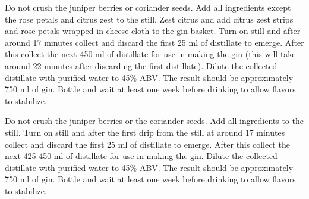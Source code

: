 \documentclass[letterpaper]{recipePMG}
\begin{document}
\newpage
{}
\label{GinNumber11}



Do not crush the juniper berries or coriander seeds. Add all ingredients except the rose petals and citrus zest to the still.  Zest citrus and add citrus zest strips and rose petals wrapped in cheese cloth to the gin basket.  Turn on still and after around 17 minutes collect and discard the first 25 ml of distillate to emerge. After this collect the next 450 ml of distillate for use in making the gin (this will take around 22 minutes after discarding the first distillate). Dilute the collected distillate with purified water to 45\% ABV. The result should be approximately 750 ml of gin. Bottle and wait at least one week before drinking to allow flavors to stabilize.


\newpage

\label{MangoMulberryGin}


Do not crush the juniper berries or the coriander seeds. Add all ingredients to the still.  Turn on still and after the first drip from the still at around 17 minutes collect and discard the first 25 ml of distillate to emerge. After this collect the next 425-450 ml of distillate for use in making the gin. Dilute the collected distillate with purified water to 45\% ABV. The result should be approximately 750 ml of gin. Bottle and wait at least one week before drinking to allow flavors to stabilize.
\end{document}
